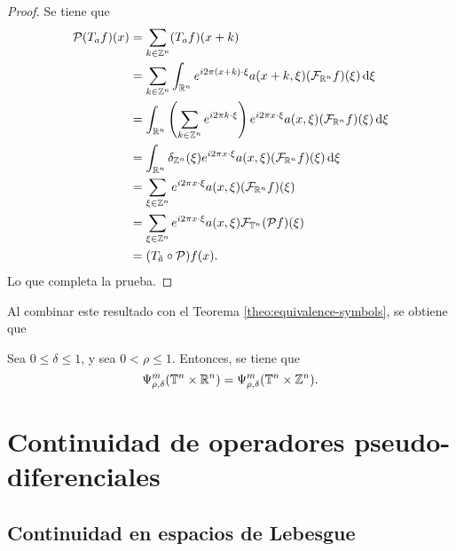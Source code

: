 \begin{proof}
	Se tiene que 
	\begin{align*}
		\mathcal{P}(T_af)(x) & = \sum_{k\in\mathbb{Z}^n}(T_af)(x+k)\\
		& = \sum_{k\in\mathbb{Z}^n}\int_{\mathbb{R}^n} e^{i2\pi(x+k)\cdot\xi}a(x+k, \xi)(\mathcal{F}_{\mathbb{R}^n}f)(\xi) \mathop{}\!\mathrm{d} \xi \\
		& = \int_{\mathbb{R}^n}\left(\sum_{k\in\mathbb{Z}^n}e^{i2\pi k\cdot\xi}\right) e^{i2\pi x\cdot\xi}a(x, \xi)(\mathcal{F}_{\mathbb{R}^n}f)(\xi) \mathop{}\!\mathrm{d} \xi \\
		& = \int_{\mathbb{R}^n}\delta_{\mathbb{Z}^n}(\xi) e^{i2\pi x\cdot\xi}a(x, \xi)(\mathcal{F}_{\mathbb{R}^n}f)(\xi) \mathop{}\!\mathrm{d} \xi \\
		& = \sum_{\xi\in\mathbb{Z}^n}e^{i2\pi x\cdot\xi}a(x, \xi)(\mathcal{F}_{\mathbb{R}^n}f)(\xi) \\
		& = \sum_{\xi\in\mathbb{Z}^n}e^{i2\pi x\cdot\xi}a(x, \xi)\mathcal{F}_{\mathbb{T}^n}(\mathcal{P}f)(\xi)  \\
		& = (T_{\tilde{a}}\circ\mathcal{P})f(x).
	\end{align*}
	Lo que completa la prueba.
\end{proof}
Al combinar este resultado con el Teorema \ref{theo:equivalence-symbols}, se obtiene que 
\begin{corollary}
	Sea $0\leq\delta\leq1$, y sea $0<\rho\leq1$. Entonces, se tiene que 
	\begin{equation*}
		\Psi^m_{\rho,\delta}(\mathbb{T}^n\times\mathbb{R}^n) = \Psi^m_{\rho,\delta}(\mathbb{T}^n\times\mathbb{Z}^n).
	\end{equation*}
\end{corollary}

\chapter{Continuidad de operadores pseudo-diferenciales}

\section{Continuidad en espacios de Lebesgue}
